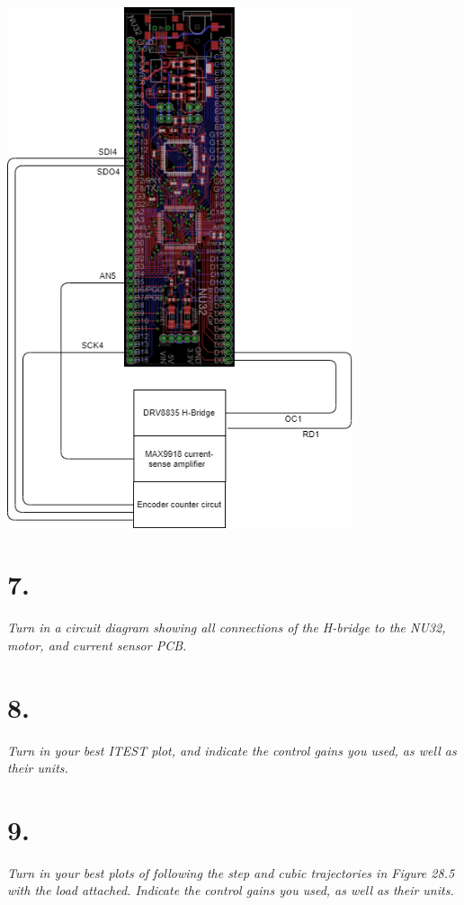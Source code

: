\documentclass[12pt]{article}
\begin{document}
\begin{center}
    \includegraphics[width=4in]{circuit_sketch.png}
\end{center}

\section*{7.}
\textit{Turn in a circuit diagram showing all connections of the H-bridge to the NU32, motor, and current sensor PCB.}

\section*{8.}
\textit{Turn in your best ITEST plot, and indicate the control gains you used, as well as their units.}

\section*{9.}
\textit{Turn in your best plots of following the step and cubic trajectories in Figure 28.5 with the load attached. Indicate the control gains you used, as well as their units.}
\end{document}

